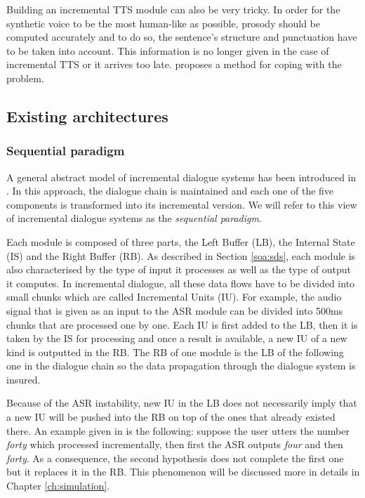 		Building an incremental TTS module can also be very tricky. In order for the synthetic voice to be the most human-like as possible, prosody should be computed accurately and to do so, the sentence's structure and punctuation have to be taken into account. This information is no longer given in the case of incremental TTS or it arrives too late. \cite{Baumann2014} proposes a method for coping with the problem. 


	\subsection{Existing architectures}
		\subsubsection{Sequential paradigm}
			
			A general abstract model of incremental dialogue systems has been introduced in \cite{Schlangen2011}. In this approach, the dialogue chain is maintained and each one of the five components is transformed into its incremental version. We will refer to this view of incremental dialogue systems as the \textit{sequential paradigm}.
				
			Each module is composed of three parts, the Left Buffer (LB), the Internal State (IS) and the Right Buffer (RB). As described in Section \ref{soa:sds}, each module is also characterised by the type of input it processes as well as the type of output it computes. In incremental dialogue, all these data flows have to be divided into small chunks which are called Incremental Units (IU). For example, the audio signal that is given as an input to the ASR module can be divided into 500ms chunks that are processed one by one. Each IU is first added to the LB, then it is taken by the IS for processing and once a result is available, a new IU of a new kind is outputted in the RB. The RB of one module is the LB of the following one in the dialogue chain so the data propagation through the dialogue system is insured.
			
			Because of the ASR instability, new IU in the LB does not necessarily imply that a new IU will be pushed into the RB on top of the ones that already existed there. An example given in \cite{Schlangen2011} is the following: suppose the user utters the number \textit{forty} which processed incrementally, then first the ASR outputs \textit{four} and then \textit{forty}. As a consequence, the second hypothesis does not complete the first one but it replaces it in the RB. This phenomenon will be discussed more in details in Chapter \ref{ch:simulation}.
			
